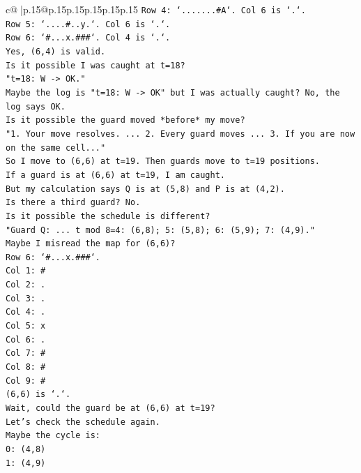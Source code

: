 \documentclass{article}
\begin{document}
{\begin{supertabular}{c@{$\;$}|p{.15\linewidth}@{}p{.15\linewidth}p{.15\linewidth}p{.15\linewidth}p{.15\linewidth}p{.15\linewidth}}
{{{\texttt{Row 4: `.......\#A`. Col 6 is `.`.} \\
\texttt{Row 5: `....\#..y.`. Col 6 is `.`.} \\
\texttt{Row 6: `\#...x.\#\#\#`. Col 4 is `.`.} \\
\texttt{Yes, (6,4) is valid.} \\
\texttt{Is it possible I was caught at t=18?} \\
\texttt{"t=18: W {-}> OK."} \\
\texttt{Maybe the log is "t=18: W {-}> OK" but I was actually caught? No, the log says OK.} \\
\texttt{Is it possible the guard moved *before* my move?} \\
\texttt{"1. Your move resolves. ... 2. Every guard moves ... 3. If you are now on the same cell..."} \\
\texttt{So I move to (6,6) at t=19. Then guards move to t=19 positions.} \\
\texttt{If a guard is at (6,6) at t=19, I am caught.} \\
\texttt{But my calculation says Q is at (5,8) and P is at (4,2).} \\
\texttt{Is there a third guard? No.} \\
\texttt{Is it possible the schedule is different?} \\
\texttt{"Guard Q: ... t mod 8=4: (6,8); 5: (5,8); 6: (5,9); 7: (4,9)."} \\
\texttt{Maybe I misread the map for (6,6)?} \\
\texttt{Row 6: `\#...x.\#\#\#`.} \\
\texttt{Col 1: \#} \\
\texttt{Col 2: .} \\
\texttt{Col 3: .} \\
\texttt{Col 4: .} \\
\texttt{Col 5: x} \\
\texttt{Col 6: .} \\
\texttt{Col 7: \#} \\
\texttt{Col 8: \#} \\
\texttt{Col 9: \#} \\
\texttt{(6,6) is `.`.} \\
\texttt{Wait, could the guard be at (6,6) at t=19?} \\
\texttt{Let's check the schedule again.} \\
\texttt{Maybe the cycle is:} \\
\texttt{0: (4,8)} \\
\texttt{1: (4,9)} \\
}}}
\end{supertabular}}
\end{document}
